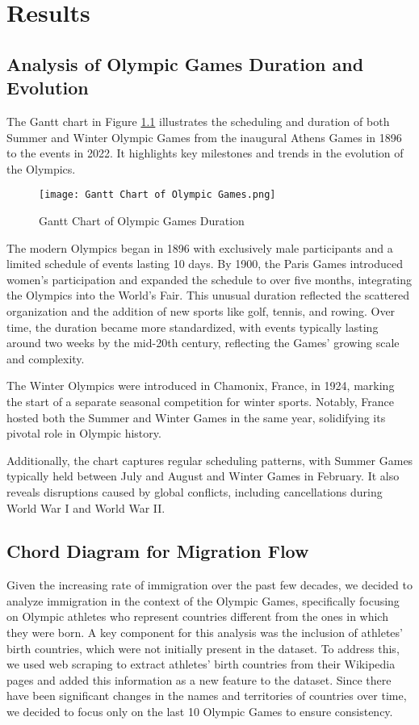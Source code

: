 \chapter{Results} \label{chap:res}

\section{Analysis of Olympic Games Duration and Evolution}

The Gantt chart in Figure \ref{fig:gantt_olympics} illustrates the scheduling and duration of both Summer and Winter Olympic Games from the inaugural Athens Games in 1896 to the events in 2022. It highlights key milestones and trends in the evolution of the Olympics.

\begin{figure}[ht]
    \centering
    \texttt{[image: Gantt Chart of Olympic Games.png]}
    \caption{Gantt Chart of Olympic Games Duration}
    \label{fig:gantt_olympics}
\end{figure}

The modern Olympics began in 1896 with exclusively male participants and a limited schedule of events lasting 10 days. By 1900, the Paris Games introduced women's participation and expanded the schedule to over five months, integrating the Olympics into the World’s Fair. This unusual duration reflected the scattered organization and the addition of new sports like golf, tennis, and rowing. Over time, the duration became more standardized, with events typically lasting around two weeks by the mid-20th century, reflecting the Games' growing scale and complexity.

The Winter Olympics were introduced in Chamonix, France, in 1924, marking the start of a separate seasonal competition for winter sports. Notably, France hosted both the Summer and Winter Games in the same year, solidifying its pivotal role in Olympic history.

Additionally, the chart captures regular scheduling patterns, with Summer Games typically held between July and August and Winter Games in February. It also reveals disruptions caused by global conflicts, including cancellations during World War I and World War II.

\section{Chord Diagram for Migration Flow}

Given the increasing rate of immigration over the past few decades, we decided to analyze immigration in the context of the Olympic Games, specifically focusing on Olympic athletes who represent countries different from the ones in which they were born. A key component for this analysis was the inclusion of athletes' birth countries, which were not initially present in the dataset. To address this, we used web scraping to extract athletes' birth countries from their Wikipedia pages and added this information as a new feature to the dataset. Since there have been significant changes in the names and territories of countries over time, we decided to focus only on the last 10 Olympic Games to ensure consistency.

